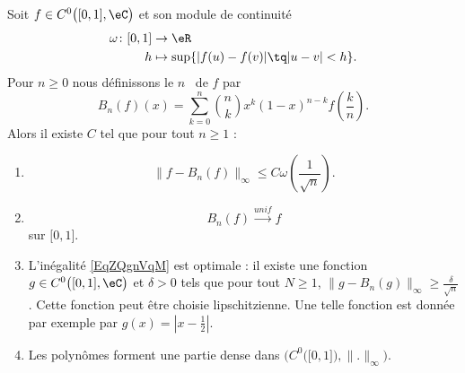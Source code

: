 \begin{theorem}    \label{ThoDJIvrty}
	Soit \( f\in C^0\big( \mathopen[ 0 , 1 \mathclose],\eC \big)\) et son module de continuité
	\begin{equation}
		\begin{aligned}
			\omega\colon \mathopen[ 0 , 1 \mathclose] & \to \eR                                        \\
			h                                         & \mapsto \sup\{ | f(u)-f(v) |\tq | u-v |< h \}.
		\end{aligned}
	\end{equation}
	Pour \( n\geq 0\) nous définissons le \( n\)\ieme\  de \( f\) par
	\begin{equation}
		B_n(f)(x)=\sum_{k=0}^{n}\binom{ n }{ k }x^k(1-x)^{n-k}f\left( \frac{ k }{ n } \right).
	\end{equation}
	Alors il existe \( C\) tel que pour tout \( n\geq 1\) :
	\begin{enumerate}
		\item
		      \begin{equation}        \label{EqZQgnVqM}
			      \| f-B_n(f) \|_{\infty}\leq C\omega\left( \frac{1}{ \sqrt{n} } \right).
		      \end{equation}
		\item
		      \begin{equation}
			      B_n(f)\stackrel{unif}{\longrightarrow}f
		      \end{equation}
		      sur \( \mathopen[ 0 , 1 \mathclose]\).
		\item
		      L'inégalité \eqref{EqZQgnVqM} est optimale : il existe une fonction \( g\in C^{0}\big( \mathopen[ 0 , 1 \mathclose],\eC \big)\) et \( \delta>0\) tels que pour tout \( N\geq 1\), \( \| g-B_n(g) \|_{\infty}\geq\frac{ \delta }{ \sqrt{n} }\). Cette fonction peut être choisie lipschitzienne. Une telle fonction est donnée par exemple par \( g(x)=| x-\frac{ 1 }{2} |\).
		\item
		      Les polynômes forment une partie dense dans \( \Big( C^0\big( \mathopen[ 0 , 1 \mathclose] \big),\| . \|_{\infty} \Big)\).
	\end{enumerate}
\end{theorem}

